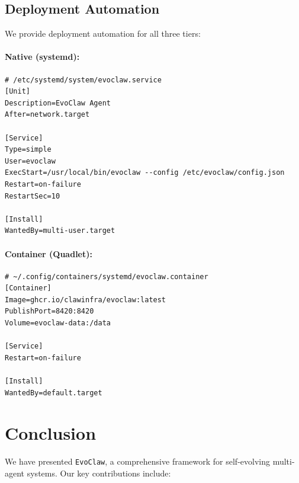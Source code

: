 \documentclass{article}
\newcommand{\evoclaw}{\texttt{EvoClaw}\xspace}
\begin{document}
\subsection{Deployment Automation}

We provide deployment automation for all three tiers:

\paragraph{Native (systemd):}
\begin{lstlisting}[basicstyle=\ttfamily\footnotesize]
# /etc/systemd/system/evoclaw.service
[Unit]
Description=EvoClaw Agent
After=network.target

[Service]
Type=simple
User=evoclaw
ExecStart=/usr/local/bin/evoclaw --config /etc/evoclaw/config.json
Restart=on-failure
RestartSec=10

[Install]
WantedBy=multi-user.target
\end{lstlisting}

\paragraph{Container (Quadlet):}
\begin{lstlisting}[basicstyle=\ttfamily\footnotesize]
# ~/.config/containers/systemd/evoclaw.container
[Container]
Image=ghcr.io/clawinfra/evoclaw:latest
PublishPort=8420:8420
Volume=evoclaw-data:/data

[Service]
Restart=on-failure

[Install]
WantedBy=default.target
\end{lstlisting}


\section{Conclusion}
\label{sec:conclusion}

We have presented \evoclaw{}, a comprehensive framework for self-evolving multi-agent systems. Our key contributions include:
\end{document}
